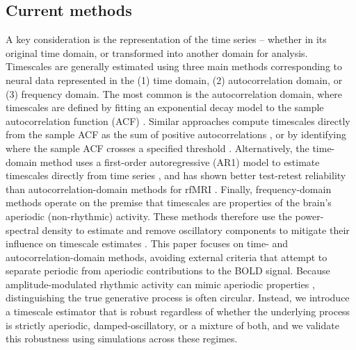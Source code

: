 \documentclass[9pt]{article}
\begin{document}
\subsection{Current methods}
A key consideration is the representation of the time series -- whether in its original time domain, or transformed into another domain for analysis. Timescales are generally estimated using three main methods corresponding to neural data represented in the (1) time domain, (2) autocorrelation domain, or (3) frequency domain. The most common is the autocorrelation domain, where timescales are defined by fitting an exponential decay model to the sample autocorrelation function (ACF) \citep{rossi-pool_invariant_2021, cirillo_neural_2018, ito_cortical_2020, runyan_distinct_2017, zeraati_flexible_2022, nougaret_intrinsic_2021, wasmuht_intrinsic_2018, muller_core_2020, maisson_choice-relevant_2021, li_hierarchical_2022, shafiei_topographic_2020}. Similar approaches compute timescales directly from the sample ACF as the sum of positive autocorrelations \citep{wengler_distinct_2020, manea_intrinsic_2022, watanabe_atypical_2019}, or by identifying where the sample ACF crosses a specified threshold \citep{wengler_distinct_2020, zilio_are_2021}. Alternatively, the time-domain method uses a first-order autoregressive (AR1) model to estimate timescales directly from time series \citep{kaneoke_variance_2012, meisel_decline_2017, huang_timescales_2018, lurie_cortical_2024, shinn_functional_2023, shafiei_topographic_2020, spitmaan_multiple_2020, trepka_training-dependent_2024}, and has shown better test-retest reliability than autocorrelation-domain methods for rfMRI \citep{huang_timescales_2018}. Finally, frequency-domain methods operate on the premise that timescales are properties of the brain's aperiodic (non-rhythmic) activity. These methods therefore use the power-spectral density to estimate and remove oscillatory components to mitigate their influence on timescale estimates \citep{donoghue_parameterizing_2020, gao_neuronal_2020, manea_neural_2024, zeraati_flexible_2022, fallon_timescales_2020}. This paper focuses on time- and autocorrelation-domain methods, avoiding external criteria that attempt to separate periodic from aperiodic contributions to the BOLD signal. Because amplitude-modulated rhythmic activity can mimic aperiodic properties \citep{he_temporal_2010, he_scale-free_2011}, distinguishing the true generative process is often circular. Instead, we introduce a timescale estimator that is robust regardless of whether the underlying process is strictly aperiodic, damped-oscillatory, or a mixture of both, and we validate this robustness using simulations across these regimes.
\end{document}
